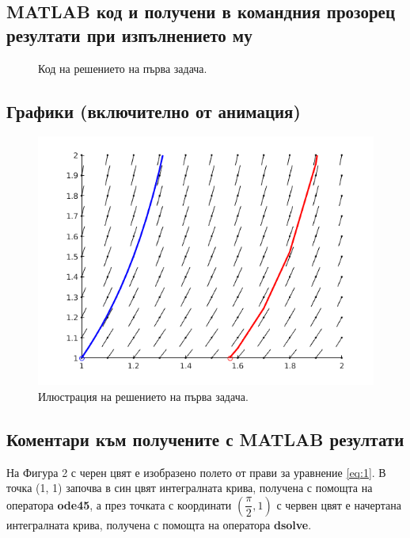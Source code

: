 \documentclass[14pt]{extarticle}
\let\frac\dfrac
\begin{document}
\subsection{MATLAB  код и получени в командния прозорец резултати при изпълнението му}

\begin{figure}[H]
	\begin{quote}
	
	\end{quote}
	\caption{Код на решението на първа задача.}
\end{figure}

\subsection{Графики (включително от анимация)}

\begin{figure}[H]
	\centering
	\includegraphics{images/task1}
	\caption{Илюстрация на решението на първа задача.}
\end{figure}

\subsection{Коментари към получените с MATLAB резултати}

На Фигура 2 с черен цвят е изобразено полето от прави за уравнение \eqref{eq:1}.
В точка (1, 1) започва в син цвят интегралната крива, получена с помощта на оператора \textbf{ode45}, а през точката с координати $\left(\frac{\pi}{2},1\right)$ с червен цвят е начертана интегралната крива, получена с помощта на оператора \textbf{dsolve}.
\end{document}
